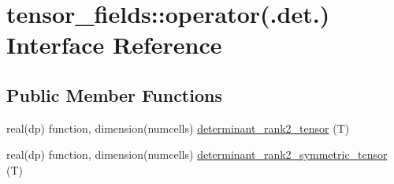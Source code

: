 \hypertarget{interfacetensor__fields_1_1operator_07_8det_8_08}{\section{tensor\-\_\-fields\-:\-:operator(.det.) Interface Reference}
\label{interfacetensor__fields_1_1operator_07_8det_8_08}
}
\subsection*{Public Member Functions}
\begin{DoxyCompactItemize}
\item 
real(dp) function, dimension(numcells) \hyperlink{interfacetensor__fields_1_1operator_07_8det_8_08_a01508cc3e793c60fc3891307f14ab7d3}{determinant\-\_\-rank2\-\_\-tensor} (T)
\item 
real(dp) function, dimension(numcells) \hyperlink{interfacetensor__fields_1_1operator_07_8det_8_08_ae2bf652332bc49b92237430c87aeda91}{determinant\-\_\-rank2\-\_\-symmetric\-\_\-tensor} (T)
\end{DoxyCompactItemize}


